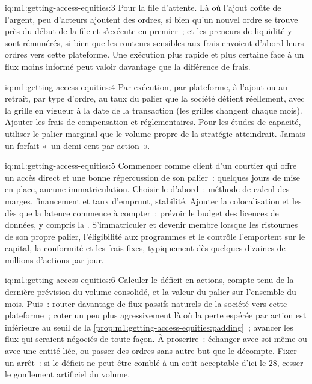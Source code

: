 \begin{solution}{iq:m1:getting-access-equities:3}
Pour la file d'attente. Là où l'ajout coûte de l'argent, peu d'acteurs ajoutent des ordres, si bien qu'un nouvel ordre se trouve près
du début de la file et s'exécute en premier~; et les preneurs de liquidité y sont rémunérés, si bien que les routeurs sensibles aux frais
envoient d'abord leurs ordres vers cette plateforme. Une exécution plus rapide et plus certaine face à un flux
moins informé peut valoir davantage que la différence de frais.
\end{solution}

\begin{solution}{iq:m1:getting-access-equities:4}
Par exécution, par plateforme, à l'ajout ou au retrait, par type d'ordre, au taux du palier
que la société détient réellement, avec la grille en vigueur à la date de la transaction (les
grilles changent chaque mois). Ajouter les frais de compensation et réglementaires. Pour les études de capacité, utiliser
le palier marginal que le volume propre de la stratégie atteindrait. Jamais un forfait
«~un demi-cent par action~».
\end{solution}

\begin{solution}{iq:m1:getting-access-equities:5}
Commencer comme client d'un courtier qui offre un accès direct et une bonne répercussion
de son palier~: quelques jours de mise en place, aucune immatriculation. Choisir le  d'abord~: méthode de calcul des marges, financement et taux d'emprunt, stabilité. Ajouter la colocalisation
et les  dès que la latence commence à compter~; prévoir le budget des licences de données,
y compris la . S'immatriculer et devenir membre lorsque les ristournes
de son propre palier, l'éligibilité aux programmes et le contrôle l'emportent sur le capital, la conformité et les
frais fixes, typiquement dès quelques dizaines de millions d'actions par jour.
\end{solution}

\begin{solution}{iq:m1:getting-access-equities:6}
Calculer le déficit en actions, compte tenu de la dernière prévision du volume consolidé,
et la valeur du palier sur l'ensemble du mois. Puis~: router davantage de
flux passifs naturels de la société vers cette plateforme~; coter un peu plus
agressivement là où la perte espérée par action est inférieure au seuil de
la \cref{prop:m1:getting-access-equities:padding}~; avancer les flux qui seraient négociés
de toute façon. À proscrire~: échanger avec soi-même ou avec une entité liée, ou passer des ordres
sans autre but que le décompte. Fixer un arrêt~: si le déficit ne peut être comblé à
un coût acceptable d'ici le 28, cesser le gonflement artificiel du volume.
\end{solution}

